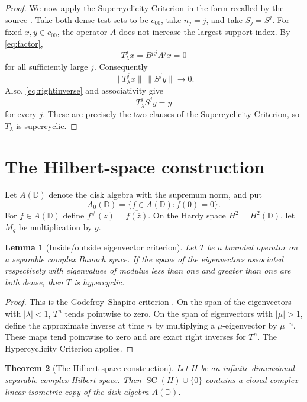 \documentclass[11pt]{article}
\newtheorem{theorem}{Theorem}
\newtheorem{lemma}[theorem]{Lemma}
\newcommand{\D}{\mathbb D}
\newcommand{\SC}{\operatorname{SC}}
\begin{document}
\begin{proof}
We now apply the Supercyclicity Criterion in the form recalled by the source
\cite{source}. Take both dense test sets to be $c_{00}$, take $n_j=j$, and
take $S_j=S^j$. For fixed $x,y\in c_{00}$, the operator $A$ does not
increase the largest support index. By \eqref{eq:factor},
\[
 T_\lambda^j x=B^{pj}A^j x=0
\]
for all sufficiently large $j$. Consequently
\[
 \|T_\lambda^j x\|\,\|S^j y\|\longrightarrow0.
\]
Also, \eqref{eq:rightinverse} and associativity give
\[
 T_\lambda^jS^j y=y
\]
for every $j$. These are precisely the two clauses of the Supercyclicity
Criterion, so $T_\lambda$ is supercyclic.
\end{proof}

\section{The Hilbert-space construction}

Let $A(\D)$ denote the disk algebra with the supremum norm, and put
\[
 A_0(\D)=\{f\in A(\D):f(0)=0\}.
\]
For $f\in A(\D)$ define $f^\#(z)=\overline{f(\overline z)}$. On the Hardy
space $H^2=H^2(\D)$, let $M_g$ be multiplication by $g$.

\begin{lemma}[Inside/outside eigenvector criterion]\label{lem:GS}
Let $T$ be a bounded operator on a separable complex Banach space. If the
spans of the eigenvectors associated respectively with eigenvalues of modulus
less than one and greater than one are both dense, then $T$ is hypercyclic.
\end{lemma}

\begin{proof}
This is the Godefroy--Shapiro criterion \cite{GS}. On the span of the
eigenvectors with $|\lambda|<1$, $T^n$ tends pointwise to zero. On the span
of eigenvectors with $|\mu|>1$, define the approximate inverse at time $n$
by multiplying a $\mu$-eigenvector by $\mu^{-n}$. These maps tend pointwise
to zero and are exact right inverses for $T^n$. The Hypercyclicity Criterion
applies.
\end{proof}

\begin{theorem}[The Hilbert-space construction]\label{thm:H}
Let $H$ be an infinite-dimensional separable complex Hilbert space. Then
$\SC(H)\cup\{0\}$ contains a closed complex-linear isometric copy of the
disk algebra $A(\D)$.
\end{theorem}
\end{document}
